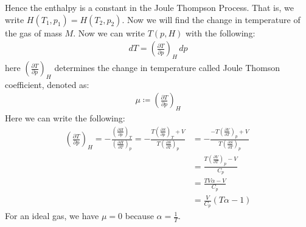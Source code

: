 \documentclass[11pt,oneside]{book}
\theoremstyle{break}
\theoremstyle{break}
\newcommand{\pd}{\partial}
\newcommand{\lr}[1]{\left( #1 \right)}
\begin{document}
Hence the enthalpy is a constant in the Joule Thompson Process. That is, we write $H(T_1,p_1) = H(T_2, p_2)$. Now we will find the change in temperature of the gas of mass $M$. Now we can write $T(p,H)$ with the following:
\begin{align*}
dT = \lr{\frac{\pd T}{\pd p}}_H \, dp
\end{align*}
here $\lr{\frac{\pd T}{\pd p}}_H$ determines the change in temperature called Joule Thomson coefficient, denoted as:
\begin{align*}
\mu \coloneqq \lr{\frac{\pd T}{\pd p}}_H
\end{align*} 
Here we can write the following:
\begin{align*}
\lr{\frac{\pd T}{\pd p}}_H = -\frac{\lr{\frac{\pd H}{\pd p}}_T}{\lr{\frac{\pd H}{\pd T}}_p} 
= - \frac{T\lr{\frac{\pd S}{\pd p}}_T+V}{T \lr{\frac{\pd S}{\pd T}}_p} &= -\frac{-T\lr{\frac{\pd V}{\pd T}}_p + V}{T\lr{\frac{\pd S}{\pd T}}_p}\\
&= \frac{T\lr{\frac{\pd V}{\pd T}}_p - V}{C_p} \\
&= \frac{TV\alpha - V}{C_p} \\
&= \frac{V}{C_p}(T\alpha-1)
\end{align*}
For an ideal gas, we have $\mu = 0$ because $\alpha = \frac{1}{T}$.\\
\end{document}
